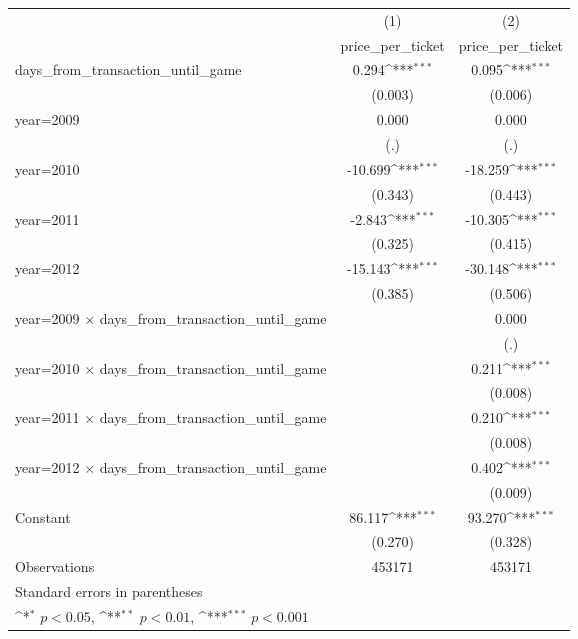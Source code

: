 {
\def\sym#1{\ifmmode^{#1}\else\(^{#1}\)\fi}
\begin{tabular}{l*{2}{c}}
\hline\hline
                    &\multicolumn{1}{c}{(1)}&\multicolumn{1}{c}{(2)}\\
                    &\multicolumn{1}{c}{price\_per\_ticket}&\multicolumn{1}{c}{price\_per\_ticket}\\
\hline
days\_from\_transaction\_until\_game&       0.294\sym{***}&       0.095\sym{***}\\
                    &     (0.003)         &     (0.006)         \\
[1em]
year=2009           &       0.000         &       0.000         \\
                    &         (.)         &         (.)         \\
[1em]
year=2010           &     -10.699\sym{***}&     -18.259\sym{***}\\
                    &     (0.343)         &     (0.443)         \\
[1em]
year=2011           &      -2.843\sym{***}&     -10.305\sym{***}\\
                    &     (0.325)         &     (0.415)         \\
[1em]
year=2012           &     -15.143\sym{***}&     -30.148\sym{***}\\
                    &     (0.385)         &     (0.506)         \\
[1em]
year=2009 $\times$ days\_from\_transaction\_until\_game&                     &       0.000         \\
                    &                     &         (.)         \\
[1em]
year=2010 $\times$ days\_from\_transaction\_until\_game&                     &       0.211\sym{***}\\
                    &                     &     (0.008)         \\
[1em]
year=2011 $\times$ days\_from\_transaction\_until\_game&                     &       0.210\sym{***}\\
                    &                     &     (0.008)         \\
[1em]
year=2012 $\times$ days\_from\_transaction\_until\_game&                     &       0.402\sym{***}\\
                    &                     &     (0.009)         \\
[1em]
Constant            &      86.117\sym{***}&      93.270\sym{***}\\
                    &     (0.270)         &     (0.328)         \\
\hline
Observations        &      453171         &      453171         \\
\hline\hline
\multicolumn{3}{l}{\footnotesize Standard errors in parentheses}\\
\multicolumn{3}{l}{\footnotesize \sym{*} \(p<0.05\), \sym{**} \(p<0.01\), \sym{***} \(p<0.001\)}\\
\end{tabular}
}
